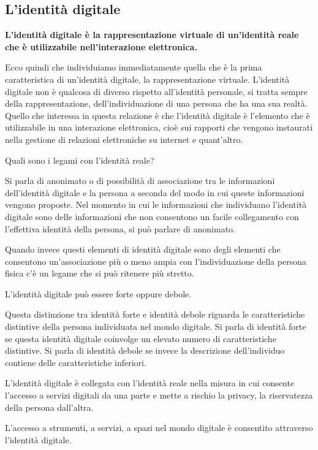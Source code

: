 \subsection{L'identità digitale}
\textbf{L'identità digitale è la rappresentazione virtuale di un'identità reale che è utilizzabile nell'interazione elettronica.} 

Ecco quindi che individuiamo immediatamente quella che è la prima caratteristica di un'identità digitale, la rappresentazione virtuale. L'identità digitale non è qualcosa di diverso rispetto all'identità personale, si tratta sempre della rappresentazione, dell'individuazione di una persona che ha una sua realtà. Quello che interessa in questa relazione è che l'identità digitale è l'elemento che è utilizzabile in una interazione elettronica, cioè sui rapporti che vengono instaurati nella gestione di relazioni elettroniche su internet e quant'altro. \par
Quali sono i legami con l'identità reale? \par
Si parla di anonimato o di possibilità di associazione tra le informazioni dell'identità digitale e la persona a seconda del modo in cui queste informazioni vengono proposte. Nel momento in cui le informazioni che individuano l'identità digitale sono delle informazioni che non consentono un facile collegamento con l'effettiva identità della persona, si può parlare di anonimato.\par 
Quando invece questi elementi di identità digitale sono degli elementi che consentono un'associazione più o meno ampia con l'individuazione della persona fisica c'è un legame che si può ritenere più stretto.\par
L'identità digitale può essere forte oppure debole.\par 
Questa distinzione tra identità forte e identità debole riguarda le caratteristiche distintive della persona individuata nel mondo digitale. Si parla di identità forte se questa identità digitale coinvolge un elevato numero di caratteristiche distintive. Si parla di identità debole se invece la descrizione dell'individuo contiene delle caratteristiche inferiori.\par
L'identità digitale è collegata con l'identità reale nella misura in cui consente l'accesso a servizi digitali da una parte e mette a rischio la privacy, la riservatezza della persona dall'altra.\par %
L'accesso a strumenti, a servizi, a spazi nel mondo digitale è consentito attraverso l'identità digitale.\par
